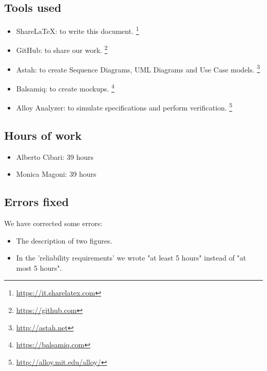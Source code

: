 \subsection*{Tools used}
    \begin{itemize}
    \item ShareLaTeX: to write this document. \footnote{\url{https://it.sharelatex.com}}
    \item GitHub: to share our work. \footnote{\url{https://github.com}} 
    \item Astah: to create Sequence Diagrams, UML Diagrams and Use Case models. \footnote{\url{http://astah.net}}
    \item Balsamiq: to create mockups. \footnote{\url{https://balsamiq.com}}
    \item Alloy Analyzer: to simulate specifications and perform verification. \footnote{\url{http://alloy.mit.edu/alloy/}}
    \end{itemize}

\subsection*{Hours of work}
    \begin{itemize}
    \item Alberto Cibari: 39 hours
    \item Monica Magoni: 39 hours
    \end{itemize}
    
\subsection*{Errors fixed}
    We have corrected some errors: 
    \begin{itemize}
    \item The description of two figures.
    \item In the 'reliability requirements' we wrote "at least 5 hours" instead of "at most 5 hours".
    \end{itemize}